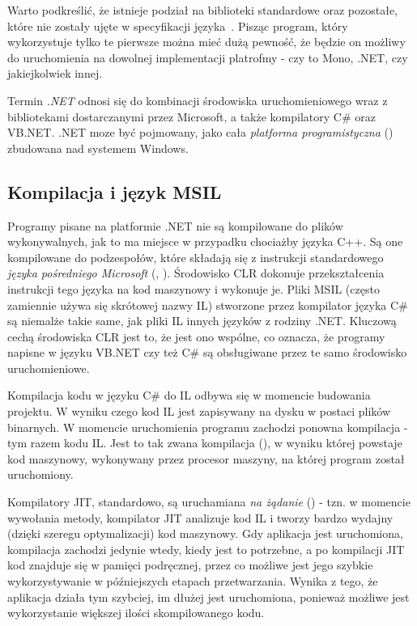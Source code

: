 Warto podkreślić, że istnieje podział na biblioteki standardowe oraz pozostałe, które nie zostały ujęte w specyfikacji języka~\cite{cSharp:spec}. Pisząc program, który wykorzystuje tylko te pierwsze można mieć dużą pewność, że będzie on możliwy do uruchomienia na dowolnej implementacji platrofmy - czy to Mono, .NET, czy jakiejkolwiek innej.

Termin \emph{.NET} odnosi się do kombinacji środowiska uruchomieniowego wraz z bibliotekami dostarczanymi przez Microsoft, a także kompilatory C\# oraz VB.NET. .NET moze być pojmowany, jako cała \emph{platforma programistyczna} () zbudowana nad systemem Windows.


\subsection{Kompilacja i język MSIL}\label{sec:msil}
Programy pisane na platformie .NET nie są kompilowane do plików wykonywalnych, jak to ma miejsce w przypadku chociażby języka C++. Są one kompilowane do podzespołów, które składają się z instrukcji standardowego \emph{języka pośredniego Microsoft} (, ). Środowisko CLR dokonuje przekształcenia instrukcji tego języka na kod maszynowy i wykonuje je. Pliki MSIL (często zamiennie używa się skrótowej nazwy IL) stworzone przez kompilator języka C\# są niemalże takie same, jak pliki IL innych języków z rodziny .NET. Kluczową cechą środowiska CLR jest to, że jest ono wspólne, co oznacza, że programy napisne w języku VB.NET czy też C\# są obsługiwane przez te samo środowisko uruchomieniowe.

Kompilacja kodu w języku C\# do IL odbywa się w momencie budowania projektu. W wyniku czego kod IL jest zapisywany na dysku w postaci plików binarnych. W momencie uruchomienia programu zachodzi ponowna kompilacja - tym razem kodu IL. Jest to tak zwana kompilacja  (), w wyniku której powstaje kod maszynowy, wykonywany przez procesor maszyny, na której program został uruchomiony.

Kompilatory JIT, standardowo, są uruchamiana \emph{na żądanie} () - tzn. w momencie wywołania metody, kompilator JIT analizuje kod IL i tworzy bardzo wydajny (dzięki szeregu optymalizacji) kod maszynowy. Gdy aplikacja jest uruchomiona, kompilacja zachodzi jedynie wtedy, kiedy jest to potrzebne, a po kompilacji JIT kod znajduje się w pamięci podręcznej, przez co możliwe jest jego szybkie wykorzystywanie w późniejszych etapach przetwarzania. Wynika z tego, że aplikacja działa tym szybciej, im dłużej jest uruchomiona, ponieważ możliwe jest wykorzystanie większej ilości skompilowanego kodu.

